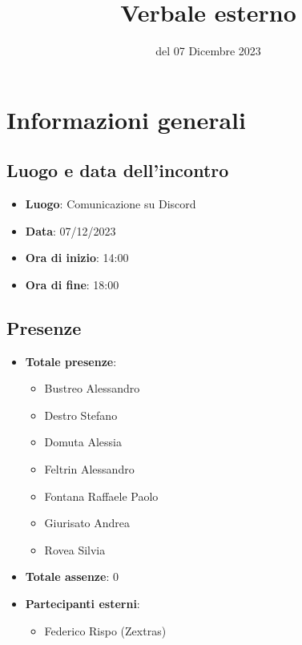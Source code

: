 \documentclass[12pt]{article}
\title{Verbale esterno}
\date{del 07 Dicembre 2023}
\begin{document}
	\makefirstpage
	
	
	\clearpage
	
	\tableofcontents
	\clearpage

    \section{Informazioni generali}
    
    \subsection{Luogo e data dell'incontro}
    
    \begin{itemize}
    	\item \textbf{Luogo}: Comunicazione su Discord
    	\item \textbf{Data}: 07/12/2023
    	\item \textbf{Ora di inizio}: 14:00
    	\item \textbf{Ora di fine}: 18:00
    \end{itemize}
    
    \subsection{Presenze}
    
    \begin{itemize}
    	\item \textbf{Totale presenze}:
    	\begin{itemize}
    		\item Bustreo Alessandro
    		\item Destro Stefano
    		\item Domuta Alessia 
    		\item Feltrin Alessandro 
    		\item Fontana Raffaele Paolo 
    		\item Giurisato Andrea 
    		\item Rovea Silvia
    	\end{itemize}
    	
    	\item \textbf{Totale assenze}: 0
    	
    	\item \textbf{Partecipanti esterni}:
    	\begin{itemize}
    		\item Federico Rispo (Zextras)
    	\end{itemize}
    \end{itemize}
    
\end{document}

